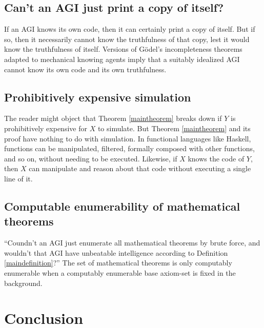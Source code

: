 \documentclass[runningheads]{llncs}
\begin{document}
\subsection{Can't an AGI just print a copy of itself?}


If an AGI knows its own code,
then it can certainly print a copy of itself.
But if so, then it necessarily cannot know the truthfulness of that
copy, lest it would know the truthfulness of itself.
Versions of G\"odel's incompleteness theorems adapted \cite{reinhardt1985absolute} to
mechanical knowing agents imply that a suitably idealized AGI cannot know
its own code
and its own truthfulness.

\subsection{Prohibitively expensive simulation}

The reader might object that Theorem \ref{maintheorem} breaks down if $Y$ is prohibitively
expensive for $X$ to simulate. But Theorem \ref{maintheorem} and its
proof have nothing to do with simulation. In functional languages like
Haskell, functions can be manipulated, filtered,
formally composed with other functions, and so on, without needing
to be executed.
Likewise, if $X$ knows the code
of $Y$, then $X$ can manipulate and reason about that code without executing a single line
of it.

\subsection{Computable enumerability of mathematical theorems}

``Coundn't an AGI just enumerate all mathematical theorems by brute force,
and wouldn't that AGI have
unbeatable intelligence according to Definition \ref{maindefinition}?''
The set of mathematical theorems is only computably enumerable when a computably
enumerable base axiom-set is fixed in the background.

\section{Conclusion}
\label{conclusionsection}
\end{document}
